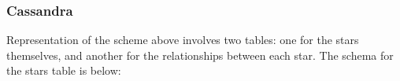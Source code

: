 \subsubsection{Cassandra}
Representation of the scheme above involves two tables: one for the stars themselves, and another for the relationships
between each star.
The schema for the stars table is below:
%







